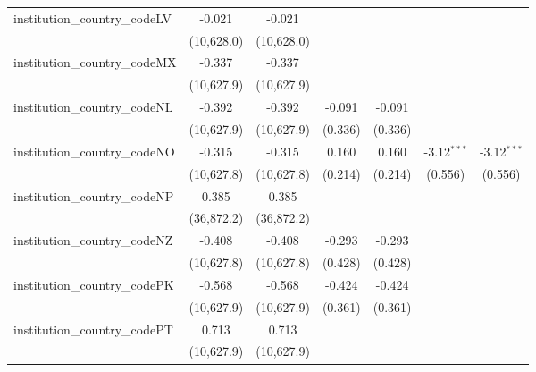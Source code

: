 \begin{tabular}{lcccccc}
   institution\_country\_codeLV          & -0.021        & -0.021        &               &               &               &   \\   
                                         & (10,628.0)    & (10,628.0)    &               &               &               &   \\   
   institution\_country\_codeMX          & -0.337        & -0.337        &               &               &               &   \\   
                                         & (10,627.9)    & (10,627.9)    &               &               &               &   \\   
   institution\_country\_codeNL          & -0.392        & -0.392        & -0.091        & -0.091        &               &   \\   
                                         & (10,627.9)    & (10,627.9)    & (0.336)       & (0.336)       &               &   \\   
   institution\_country\_codeNO          & -0.315        & -0.315        & 0.160         & 0.160         & -3.12$^{***}$ & -3.12$^{***}$\\   
                                         & (10,627.8)    & (10,627.8)    & (0.214)       & (0.214)       & (0.556)       & (0.556)\\   
   institution\_country\_codeNP          & 0.385         & 0.385         &               &               &               &   \\   
                                         & (36,872.2)    & (36,872.2)    &               &               &               &   \\   
   institution\_country\_codeNZ          & -0.408        & -0.408        & -0.293        & -0.293        &               &   \\   
                                         & (10,627.8)    & (10,627.8)    & (0.428)       & (0.428)       &               &   \\   
   institution\_country\_codePK          & -0.568        & -0.568        & -0.424        & -0.424        &               &   \\   
                                         & (10,627.9)    & (10,627.9)    & (0.361)       & (0.361)       &               &   \\   
   institution\_country\_codePT          & 0.713         & 0.713         &               &               &               &   \\   
                                         & (10,627.9)    & (10,627.9)    &               &               &               &   \\   

\end{tabular}
